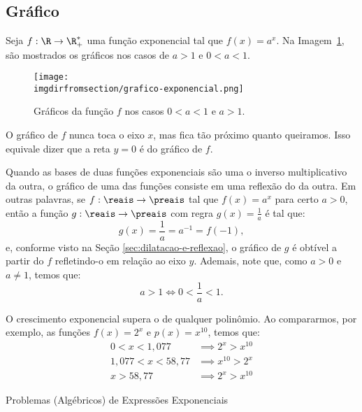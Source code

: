 \subsection{Gráfico}

\begin{example}
    Seja $f: \R \to \R_+^*$ uma função exponencial tal que $f(x) =
a^x$. Na Imagem~\ref{img:graficos-exponencial}, são mostrados os gráficos
nos casos de $a > 1$ e $0 < a < 1$.
%
\begin{figure}[H]
    \centering
    \texttt{[image: \\imgdirfromsection/grafico-exponencial.png]}
    \caption{Gráficos da função $f$ nos casos $0<a<1$ e $a>1$.}
    \label{img:graficos-exponencial}
\end{figure}
%
O gráfico de $f$ nunca toca o eixo $x$, mas fica tão próximo quanto
queiramos. Isso equivale dizer que a reta $y=0$ é  do
gráfico de $f$.
\end{example}

\begin{remark}
    Quando as bases de duas funções exponenciais são uma o inverso multiplicativo da outra, o gráfico de uma 
    das funções consiste em uma reflexão do da outra. Em outras palavras, se $f:\reais \to \preais$
    tal que $f(x) = a^x $ para certo $a > 0$, então a função $g:\reais \to \preais$ com regra 
    $g(x) = \frac 1 a$ é tal que:
    \[
        g(x) = \frac 1 a = a^{-1} = f(-1),    
    \]
    e, conforme visto na Seção \ref{sec:dilatacao-e-reflexao}, o gráfico de $g$ é obtível a partir do $f$ refletindo-o em relação ao eixo
    $y$. Ademais, note que, como $a > 0$ e $a \ne 1$, temos que:
    $$a > 1 \iff 0 < \frac{1}{a} < 1.$$
\end{remark}

\begin{example}
    O crescimento exponencial supera o de qualquer polinômio. Ao compararmos, por exemplo, as funções $f(x) = 2^x$ e $p(x)=x^{10}$, temos que:
    \begin{align*}
        0<x<1{,}077 & \implies  2^x > x^{10} \\
        1{,}077 < x < 58{,}77 & \implies  x^{10} > 2^x \\
        x>58{,}77 & \implies  2^x > x^{10}
    \end{align*}
\end{example}

\begin{onlineact}
    {Problemas (Algébricos) de Expressões Exponenciais}
\end{onlineact}

